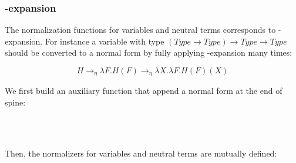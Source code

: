 \subsubsection*{\eta-expansion}

The normalization functions for variables and neutral terms corresponds to \eta-expansion. For instance a variable with type $(Type \to Type) \to Type \to Type$ should be converted to a normal form by fully applying \eta-expansion many times:

\[ H \to_{\eta} \lambda F. H (F) \to_{\eta} \lambda X. \lambda F. H (F) (X) \]

We first build an auxiliary function that append a normal form at the end of spine:

\begin{code}%
\>[0]\AgdaSpace{}%
\AgdaSymbol{:}\AgdaSpace{}%
\AgdaSpace{}%
\AgdaSpace{}%
\AgdaSpace{}%
\AgdaSymbol{(}\AgdaSpace{}%
\AgdaSpace{}%
\AgdaSymbol{)}\AgdaSpace{}%
\AgdaSpace{}%
\AgdaSpace{}%
\AgdaSpace{}%
\AgdaSpace{}%
\AgdaSpace{}%
\AgdaSpace{}%
\AgdaSpace{}%
\AgdaSpace{}%
\<%
\\
\>[0]\AgdaSpace{}%
\AgdaSpace{}%
\AgdaSpace{}%
\AgdaSymbol{=}\AgdaSpace{}%
\AgdaSpace{}%
\AgdaOperator{\AgdaInductiveConstructor{,}}\AgdaSpace{}%
\<%
\\
\>[0]\AgdaSpace{}%
\AgdaSymbol{(}\AgdaSpace{}%
\AgdaOperator{\AgdaInductiveConstructor{,}}\AgdaSpace{}%
\AgdaSymbol{)}\AgdaSpace{}%
\AgdaSpace{}%
\AgdaSymbol{=}\AgdaSpace{}%
\AgdaSpace{}%
\AgdaOperator{\AgdaInductiveConstructor{,}}\AgdaSpace{}%
\AgdaSpace{}%
\AgdaSpace{}%
\<%
\end{code}

Then, the normalizers for variables and neutral terms are mutually defined:

\begin{code}[hide]%
\>[0]\<%
\end{code}


